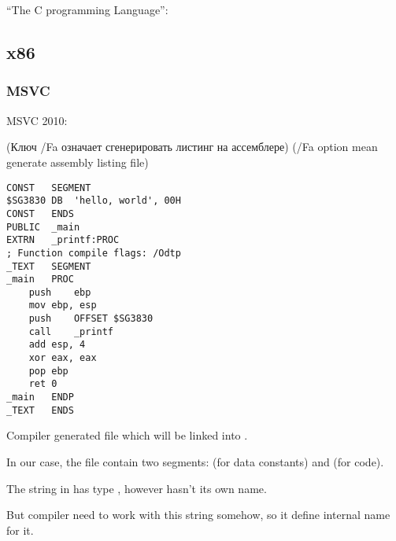 ﻿\section{\HelloWorldSectionName}
\label{sec:helloworld}

 ``The C programming Language''\cite{Kernighan:1988:CPL:576122}:



\subsection{x86}

\subsubsection{MSVC}

 MSVC 2010: 

\IFRU
{(Ключ /Fa означает сгенерировать листинг на ассемблере)}
{(/Fa option mean generate assembly listing file)}

\begin{lstlisting}
CONST	SEGMENT
$SG3830	DB	'hello, world', 00H
CONST	ENDS
PUBLIC	_main
EXTRN	_printf:PROC
; Function compile flags: /Odtp
_TEXT	SEGMENT
_main	PROC
	push	ebp
	mov	ebp, esp
	push	OFFSET $SG3830
	call	_printf
	add	esp, 4
	xor	eax, eax
	pop	ebp
	ret	0
_main	ENDP
_TEXT	ENDS
\end{lstlisting}

{Compiler generated  file which will be linked into .}

{In our case, the file contain two segments:  (for data constants) and  (for code).} 

{The string  in \CCpp has type , however hasn't its own name.}

{But compiler need to work with this string somehow, so it define internal name  for it.}

